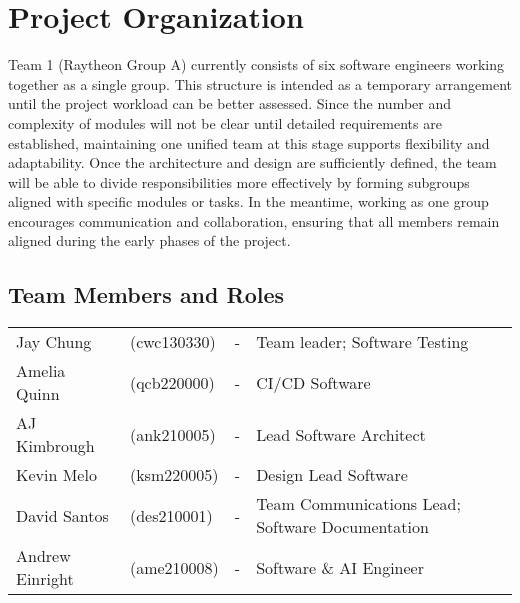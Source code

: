 \section{Project Organization}

Team 1 (Raytheon Group A) currently consists of six software engineers working together as a single group. This structure is intended as a temporary arrangement until the project workload can be better assessed. Since the number and complexity of modules will not be clear until detailed requirements are established, maintaining one unified team at this stage supports flexibility and adaptability. Once the architecture and design are sufficiently defined, the team will be able to divide responsibilities more effectively by forming subgroups aligned with specific modules or tasks. In the meantime, working as one group encourages communication and collaboration, ensuring that all members remain aligned during the early phases of the project.

\subsection*{Team Members and Roles}
\begin{center}
    \begin{tabular}{llll}
        Jay Chung       & (cwc130330) & - & Team leader; Software Testing\\
        Amelia Quinn    & (qcb220000) & - & CI/CD Software\\
        AJ Kimbrough    & (ank210005) & - & Lead Software Architect\\
        Kevin Melo      & (ksm220005) & - & Design Lead Software\\
        David Santos    & (des210001) & - & Team Communications Lead; Software Documentation\\
        Andrew Einright & (ame210008) & - & Software \& AI Engineer \\
    \end{tabular}
\end{center}